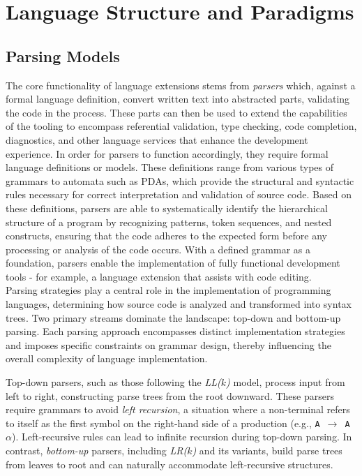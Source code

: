\section{Language Structure and Paradigms}

\subsection{Parsing Models}
\label{sec:parser}

The core functionality of language extensions stems from \textit{parsers} which, against a formal language
definition, convert written text into abstracted parts, validating the code in the process. These parts can then be used to extend the capabilities of the
tooling to encompass referential validation, type checking, code completion, diagnostics, and other language services that enhance the development experience.
In order for parsers to function accordingly, they require formal language definitions or models. These definitions range from various types of grammars to
automata such as PDAs, which provide the structural and syntactic rules necessary for correct interpretation and validation of source code.
Based on these definitions, parsers are able to systematically identify the hierarchical structure of a program by recognizing patterns, token sequences, and nested
constructs, ensuring that the code adheres to the expected form before any processing or analysis of the code occurs.
With a defined grammar as a foundation, parsers enable the implementation of fully functional development tools - for example, a language extension that assists with code editing.
\\

Parsing strategies play a central role in the implementation of programming languages, determining how source code is analyzed and transformed into syntax trees.
Two primary streams dominate the landscape: top-down and bottom-up parsing. Each parsing approach encompasses distinct implementation strategies and imposes specific
constraints on grammar design, thereby influencing the overall complexity of language implementation.

Top-down parsers, such as those following the \textit{LL($k$)} model, process input from left to right, constructing parse trees from the root downward.
These parsers require grammars to avoid \textit{left recursion}, a situation where a non-terminal refers to itself as the first symbol on the right-hand side of a
production (e.g., \texttt{A}~$\rightarrow$~\texttt{A}~$\alpha$). Left-recursive rules can lead to infinite recursion during top-down parsing.
In contrast, \textit{bottom-up} parsers, including \textit{LR($k$)} and its variants, build parse trees from leaves to root and can naturally accommodate
left-recursive structures.

